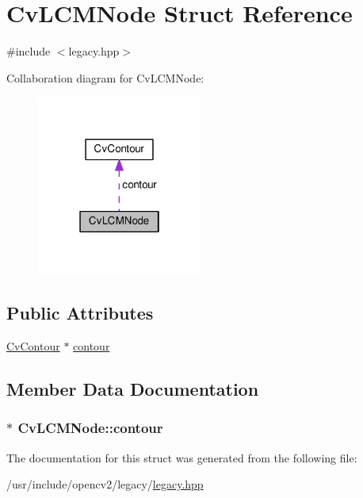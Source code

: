 \hypertarget{structCvLCMNode}{\section{Cv\-L\-C\-M\-Node Struct Reference}
\label{structCvLCMNode}
}


{\ttfamily \#include $<$legacy.\-hpp$>$}



Collaboration diagram for Cv\-L\-C\-M\-Node\-:\nopagebreak
\begin{figure}[H]
\begin{center}
\leavevmode
\includegraphics[width=154pt]{structCvLCMNode__coll__graph}
\end{center}
\end{figure}
\subsection*{Public Attributes}
\begin{DoxyCompactItemize}
\item 
\hyperlink{structCvContour}{Cv\-Contour} $\ast$ \hyperlink{structCvLCMNode_a8af2cb0a0c8b9595d19d18d9cc54edce}{contour}
\end{DoxyCompactItemize}


\subsection{Member Data Documentation}
\hypertarget{structCvLCMNode_a8af2cb0a0c8b9595d19d18d9cc54edce}{
\subsubsection[{contour}]{$\ast$ Cv\-L\-C\-M\-Node\-::contour}}\label{structCvLCMNode_a8af2cb0a0c8b9595d19d18d9cc54edce}


The documentation for this struct was generated from the following file\-:\begin{DoxyCompactItemize}
\item 
/usr/include/opencv2/legacy/\hyperlink{legacy_8hpp}{legacy.\-hpp}\end{DoxyCompactItemize}
